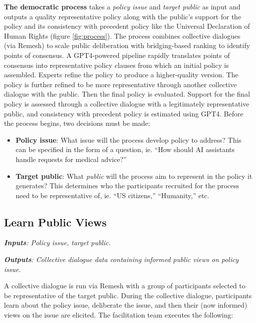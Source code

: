 \documentclass{article}
\begin{document}
\textbf{The democratic process} takes a \emph{policy issue} and \emph{target public} as input and outputs a quality representative policy along with the public’s support for the policy and its consistency with precedent policy like the Universal Declaration of Human Rights (figure \ref{fig:process}). The process combines collective dialogues (via Remesh) to scale public deliberation with bridging-based ranking to identify points of consensus. A GPT4-powered pipeline rapidly translates points of consensus into representative policy clauses from which an initial policy is assembled. Experts refine the policy to produce a higher-quality version. The policy is further refined to be more representative through another collective dialogue with the public. Then the final policy is evaluated. Support for the final policy is assessed through a collective dialogue with a legitimately representative public, and consistency with precedent policy is estimated using GPT4.   Before the process begins, two decisions must be made:
\begin{itemize}
    \item \textbf{Policy issue}: What issue will the process develop policy to address? This can be specified in the form of a question, ie. “How should AI assistants handle requests for medical advice?” 
    \item \textbf{Target public}: What \emph{public} will the process aim to represent in the policy it generates? This determines who the participants recruited for the process need to be representative of, ie. “US citizens,” “Humanity,” etc. 
\end{itemize}


\subsection{Learn Public Views}

\begin{tcolorbox}[colback=blue!5!white,colframe=blue!30!white]
  \emph{\textbf{Inputs}: Policy issue, target public.}

\emph{\textbf{Outputs}: Collective dialogue data containing informed public views on policy issue.}
\end{tcolorbox}

A collective dialogue is run via Remesh with a group of participants selected to be representative of the target public. During the collective dialogue, participants learn about the policy issue, deliberate the issue, and then their (now informed) views on the issue are elicited. The facilitation team executes the following:
\end{document}

